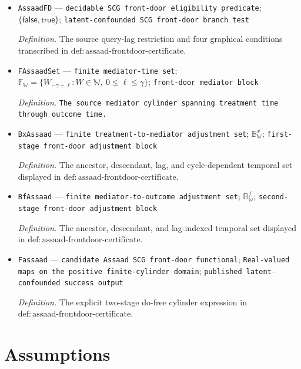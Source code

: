 \documentclass{article}
\begin{document}
\begin{itemize}
  \item \texttt{AssaadFD} --- \texttt{decidable SCG front-\allowbreak{}door eligibility predicate}; \(\{\mathsf{false},\mathsf{true}\}\); \texttt{latent-\allowbreak{}confounded SCG front-\allowbreak{}door branch test}
  \par\smallskip\noindent\emph{Definition.} The source query-lag restriction and four graphical conditions transcribed in \(\mathrm{def:assaad\text{-}frontdoor\text{-}certificate}\).
  \item \texttt{FAssaadSet} --- \texttt{finite mediator-\allowbreak{}time set}; \(\mathbb F_{\mathbb W}=\{W_{-\gamma+\ell}:W\in\mathbb W,\ 0\le\ell\le\gamma\}\); \texttt{front-\allowbreak{}door mediator block}
  \par\smallskip\noindent\emph{Definition.} \texttt{The source mediator cylinder spanning treatment time through outcome time.}
  \item \texttt{BxAssaad} --- \texttt{finite treatment-\allowbreak{}to-\allowbreak{}mediator adjustment set}; \(\mathbb B^x_{\mathbb W}\); \texttt{first-\allowbreak{}stage front-\allowbreak{}door adjustment block}
  \par\smallskip\noindent\emph{Definition.} The ancestor, descendant, lag, and cycle-dependent temporal set displayed in \(\mathrm{def:assaad\text{-}frontdoor\text{-}certificate}\).
  \item \texttt{BfAssaad} --- \texttt{finite mediator-\allowbreak{}to-\allowbreak{}outcome adjustment set}; \(\mathbb B^f_{\mathbb W}\); \texttt{second-\allowbreak{}stage front-\allowbreak{}door adjustment block}
  \par\smallskip\noindent\emph{Definition.} The ancestor, descendant, and lag-indexed temporal set displayed in \(\mathrm{def:assaad\text{-}frontdoor\text{-}certificate}\).
  \item \texttt{Fassaad} --- \texttt{candidate Assaad SCG front-\allowbreak{}door functional}; \texttt{Real-\allowbreak{}valued maps on the positive finite-\allowbreak{}cylinder domain}; \texttt{published latent-\allowbreak{}confounded success output}
  \par\smallskip\noindent\emph{Definition.} The explicit two-stage do-free cylinder expression in \(\mathrm{def:assaad\text{-}frontdoor\text{-}certificate}\).
\end{itemize}

\section{Assumptions}
\end{document}
